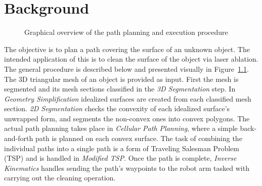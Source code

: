 \chapter{Background}\label{sec:bkgd}

\begin{figure}[hb]
	\centering
{}
	\caption{Graphical overview of the path planning and execution procedure}
	\label{fig:bkgd_overview}
\end{figure}
The objective is to plan a path covering the surface of an unknown object.
The intended application of this is to clean the surface of the object via laser ablation.
The general procedure is described below and presented visually in Figure~\ref{fig:bkgd_overview}.
The 3D triangular mesh of an object is provided as input.
First the mesh is segmented and its mesh sections classified in the \textit{3D Segmentation} step.
In \textit{Geometry Simplification} idealized surfaces are created from each classified mesh section.
\textit{2D Segmentation} checks the convexity of each idealized surface's unwrapped form, and segments the non-convex ones into convex polygons.
The actual path planning takes place in \textit{Cellular Path Planning}, where a simple back-and-forth path is planned on each convex surface.
The task of combining the individual paths into a single path is a form of Traveling Salesman Problem (TSP) and is handled in \textit{Modified TSP}.
Once the path is complete, \textit{Inverse Kinematics} handles sending the path's waypoints to the robot arm tasked with carrying out the cleaning operation.

